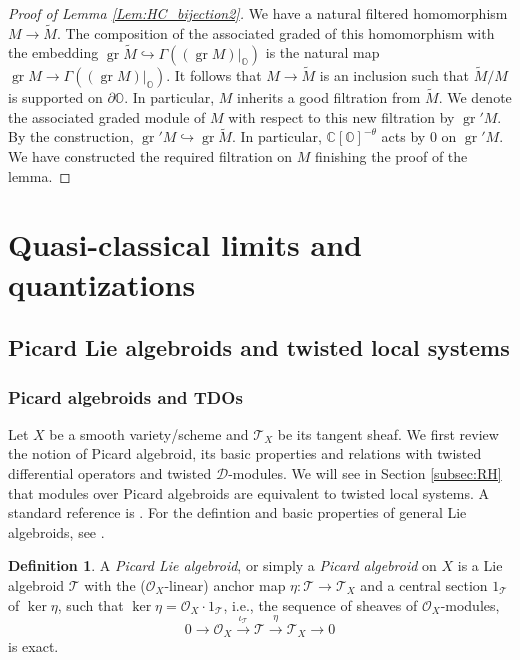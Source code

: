 \documentclass[12pt]{amsart}
\newcommand{\C}{\mathbb{C}}
\newcommand{\Orb}{\mathbb{O}}
\newcommand{\gr}{\operatorname{gr}}
\newcommand{\T}{\mathcal{T}}
\newcommand{\TT}{\mathscr{T}}
\newcommand{\OO}{\mathcal{O}}
\theoremstyle{definition}
\newtheorem{defi}[Thm]{Definition}
\numberwithin{equation}{section}
\begin{document}
\begin{proof}[Proof of Lemma \ref{Lem:HC_bijection2}]
We have a natural filtered homomorphism $M\rightarrow \tilde{M}$. The composition of the associated graded of this homomorphism with the embedding
$\gr\tilde{M}\hookrightarrow \Gamma((\gr M)|_{\Orb})$ is the natural
map $\gr M\rightarrow \Gamma((\gr M)|_{\Orb})$. It follows that $M\rightarrow \tilde{M}$
is an inclusion such that $\tilde{M}/M$ is supported on $\partial\Orb$. In particular,
$M$ inherits a good filtration from $\tilde{M}$. We denote the associated graded module of $M$ with respect to this new filtration by $\gr' M$. By the construction,
$\gr' M\hookrightarrow \gr\tilde{M}$. In particular,
$\C[\Orb]^{-\theta}$ acts by $0$ on $\gr' M$. We have constructed the required
filtration on $M$ finishing the proof of the lemma.
\end{proof}




\section{Quasi-classical limits and quantizations}\label{S_qclass_quant}


\subsection{Picard Lie algebroids and  twisted local systems }

\subsubsection{Picard algebroids and TDOs} \label{subsec:pic_defn}

Let $X$ be a smooth variety/scheme and $\T_X$ be its tangent sheaf. We first review the notion of Picard algebroid, its basic properties and relations with twisted differential operators and twisted $\mathscr{D}$-modules. We will see in Section \ref{subsec:RH} that modules over Picard algebroids are equivalent to twisted local systems. A standard reference is \cite[Section 2]{BB}. For the defintion and basic properties of general Lie algebroids, see \cite[Section 1.2]{BB}.

\begin{defi} \label{defn:pic}
	A {\it Picard Lie algebroid}, or simply a {\it Picard algebroid} on $X$ is a Lie algebroid $\TT$ with the ($\OO_X$-linear) anchor map $\eta: \TT \to\T_X$ and a central section $1_{\TT}$ of $\ker \eta$, such that $\ker \eta = \OO_X \cdot 1_{\TT}$, i.e., the sequence of sheaves of $\OO_X$-modules,
	\[  0 \to \OO_X \xrightarrow{\iota_\TT} \TT \xrightarrow{\eta} \T_X \to 0\]
	is exact.
\end{defi}
\end{document}
